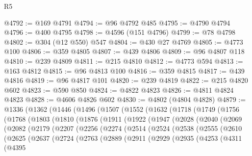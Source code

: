 \begin{lexlean}{R5}
\begin{coremodule}
@4792 := @169 @4791
@4794 := @96 @4792 @485
@4795 := @4790 @4794
@4796 := @400 @4795
@4798 := @4596 (@151 @4796)
@4799 := @78 @4798
@4802 := @304 (@12 @550) @547
@4804 := @430 @27 @4769
@4805 := @4773 @100
@4806 := @359 @4805
@4807 := @439 @4806
@4809 := @96 @4807 @118
@4810 := @239 @4809
@4811 := @215 @4810
@4812 := @4773 @594
@4813 := @163 @4812
@4815 := @96 @4813 @100
@4816 := @359 @4815
@4817 := @439 @4816
@4819 := @96 @4817 @101
@4820 := @239 @4819
@4822 := @215 @4820 @602
@4823 := @590 @850
@4824 := @4822 @4823
@4826 := @4811 @4824 @4823
@4828 := @4606 @4826 @602
@4830 := @4802 (@4804 @4828)
@4879 := @1336
    (@1362
      (@1446
        (@1496
          (@1507
            (@1552
              (@1632
                (@1718
                  (@1749
                    (@1756
                      (@1768
                        (@1803
                          (@1810
                            (@1876
                              (@1911
                                (@1922
                                  (@1947
                                    (@2028
                                      (@2040
                                        (@2069
                                          (@2082
                                            (@2179
                                              (@2207
                                                (@2256
                                                  (@2274
                                                    (@2514
                                                      (@2524
                                                        (@2538
                                                          (@2555
                                                            (@2610
                                                              (@2625
                                                                (@2637
                                                                  (@2724
                                                                    (@2763
                                                                      (@2889
                                                                        (@2911
                                                                          (@2929
                                                                            (@2935
                                                                              (@4253
                                                                                (@4311
                                                                                  (@4395

\end{coremodule}
\end{lexlean}
